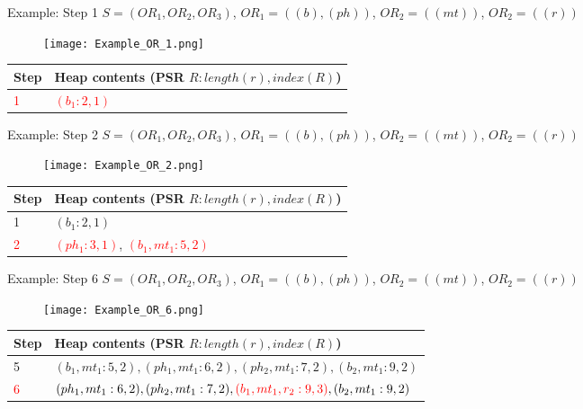 \begin{frame}{Example: Step 1}
	$S = (OR_1, OR_2, OR_3)$, $OR_1 = ((b), (ph))$, $OR_2 = ((mt))$, $OR_2 = ((r))$
	
	\begin{figure}[h]
		\texttt{[image: Example\_OR\_1.png]}
	\end{figure}
	
	\begin{table}[h]
		\centering
		\begin{tabular}{ |l|p{10cm}| } 
			\hline
			Step & Heap contents (PSR $R : length(r), index(R)$) \\
			\hline
			\textcolor{red}{1} & \textcolor{red}{$(b_1 : 2, 1)$} \\ 
			\hline
		\end{tabular}
	\end{table}

\end{frame}

\begin{frame}{Example: Step 2}
	$S = (OR_1, OR_2, OR_3)$, $OR_1 = ((b), (ph))$, $OR_2 = ((mt))$, $OR_2 = ((r))$
	
	\begin{figure}[h]
		\texttt{[image: Example\_OR\_2.png]}
	\end{figure}
	
	\begin{table}[h]
		\centering
		\begin{tabular}{ |l|p{10cm}| } 
			\hline
			Step & Heap contents (PSR $R : length(r), index(R)$) \\
			\hline
			1 & $(b_1 : 2, 1)$ \\ 
			\hline
			\textcolor{red}{2} & \textcolor{red}{$(ph_1 : 3, 1)$}, \textcolor{red}{$(b_1, mt_1 : 5, 2)$} \\ 
			\hline
		\end{tabular}
	\end{table}

\end{frame}

\begin{frame}{Example: Step 6}
	$S = (OR_1, OR_2, OR_3)$, $OR_1 = ((b), (ph))$, $OR_2 = ((mt))$, $OR_2 = ((r))$
	
	\begin{figure}[h]
		\texttt{[image: Example\_OR\_6.png]}
	\end{figure}
	
	\begin{table}[h]
		\centering
		\begin{tabular}{ |l|p{10cm}| } 
			\hline
			Step & Heap contents (PSR $R : length(r), index(R)$) \\
			\hline
			5 & $(b_1, mt_1 : 5, 2), (ph_1, mt_1 : 6, 2), (ph_2, mt_1 : 7, 2), (b_2, mt_1 : 9, 2)$ \\ 
			\hline
			\textcolor{red}{6} & $(ph_1, mt_1 : 6, 2), (ph_2, mt_1 : 7, 2), \textcolor{red}{(b_1, mt_1, r_2 : 9, 3)}, (b_2, mt_1 : 9, 2)$ \\ 
			\hline
		\end{tabular}
	\end{table}

\end{frame}

